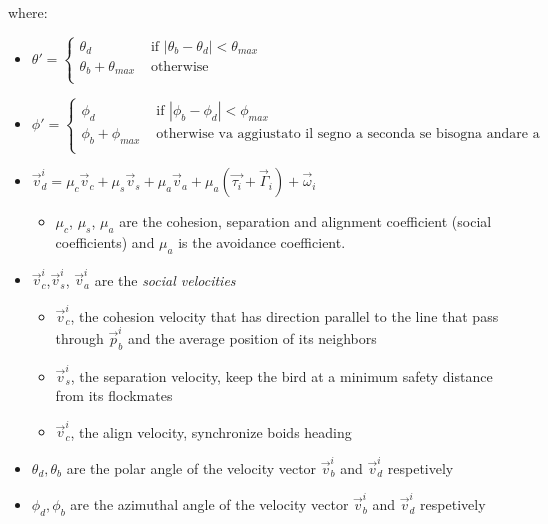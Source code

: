 where:
\begin{itemize}
  \item $
     \theta' = \begin{cases}
    \theta_d &\mbox{ if }  |\theta_b - \theta_d| < \theta_{max}\\
    \theta_b + \theta_{max} &\mbox{ otherwise }\\
    \end{cases}
  $ \hfill \\
  
    \item $
     \phi' = \begin{cases}
    \phi_d &\mbox{ if }  |\phi_b - \phi_d| < \phi_{max}\\
    \phi_b + \phi_{max} &\mbox{ otherwise va aggiustato il segno a seconda se
    bisogna andare a destra o sinistra}\\
    \end{cases}
  $ \hfill \\ 
   

\item $ \vec{v}_d^i = \mu_c \vec{v}_c + \mu_s\vec{v}_s + \mu_a \vec{v}_a + \mu_{a} \left(
\vec{{\tau}_i} + \vec{\Gamma}_i \right) + \vec{\omega}_i $

\begin{itemize}
	\item $\mu_c$, $\mu_s$, $\mu_a$ are the cohesion, separation and alignment coefficient (social coefficients) and $\mu_a$ is the avoidance coefficient. 
\end{itemize}
\item  $\vec{v}^i_c$,$\vec{v}^i_s$, $\vec{v}^i_a$ are the  \textit{social velocities} \cite{Hemelrijk}
  \begin{itemize}
    \item $\vec{v}^i_c$, the cohesion velocity that has direction parallel to the
    line that pass through $\vec{p}_b^i$ and the average position of its neighbors
    \item $\vec{v}^i_s$, the separation velocity, keep the bird at a minimum
    safety distance from its flockmates
    \item  $\vec{v}^i_c$, the align velocity, synchronize boids heading
  \end{itemize}
 \item $\theta_d,\theta_b$ are the polar angle of the velocity vector
 $\vec{v}^i_b$ and $\vec{v}^i_d$ respetively
 \item $\phi_d,\phi_b$ are the azimuthal angle of the velocity vector
 $\vec{v}^i_b$ and $\vec{v}^i_d$ respetively


\end{itemize}



